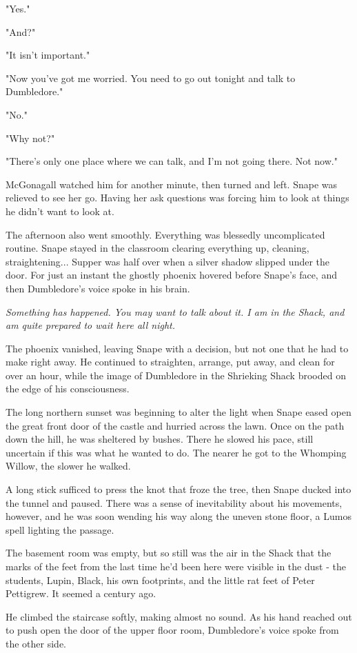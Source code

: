 \documentclass[a4paper,11pt]{article}
\begin{document}
"Yes."

"And?"

"It isn't important."

"Now you've got me worried. You need to go out tonight and talk to Dumbledore."

"No."

"Why not?"

"There's only one place where we can talk, and I'm not going there. Not now."

McGonagall watched him for another minute, then turned and left. Snape was relieved to see her go. Having her ask questions was forcing him to look at things he didn't want to look at.

The afternoon also went smoothly. Everything was blessedly uncomplicated routine. Snape stayed in the classroom clearing everything up, cleaning, straightening... Supper was half over when a silver shadow slipped under the door. For just an instant the ghostly phoenix hovered before Snape's face, and then Dumbledore's voice spoke in his brain.

\emph{Something has happened. You may want to talk about it. I am in the Shack, and am quite prepared to wait here all night.}

The phoenix vanished, leaving Snape with a decision, but not one that he had to make right away. He continued to straighten, arrange, put away, and clean for over an hour, while the image of Dumbledore in the Shrieking Shack brooded on the edge of his consciousness.

The long northern sunset was beginning to alter the light when Snape eased open the great front door of the castle and hurried across the lawn. Once on the path down the hill, he was sheltered by bushes. There he slowed his pace, still uncertain if this was what he wanted to do. The nearer he got to the Whomping Willow, the slower he walked.

A long stick sufficed to press the knot that froze the tree, then Snape ducked into the tunnel and paused. There was a sense of inevitability about his movements, however, and he was soon wending his way along the uneven stone floor, a Lumos spell lighting the passage.

The basement room was empty, but so still was the air in the Shack that the marks of the feet from the last time he'd been here were visible in the dust - the students, Lupin, Black, his own footprints, and the little rat feet of Peter Pettigrew. It seemed a century ago.

He climbed the staircase softly, making almost no sound. As his hand reached out to push open the door of the upper floor room, Dumbledore's voice spoke from the other side.
\end{document}
